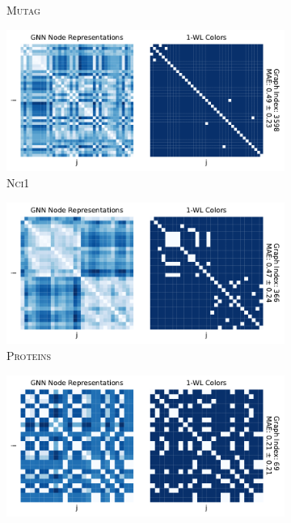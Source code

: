 \begin{figure}
\begin{subfigure}[b]{0.49\textwidth}
		\vspace*{-5ex} 
        \caption{\textsc{Mutag}}
	\end{subfigure}
	\hfill
	\begin{subfigure}[b]{0.49\textwidth}
		\centering
		\includegraphics[width=\textwidth]{Figures/heatmaps_NCI1_single.pdf}
		\vspace*{-5ex} 
        \caption{\textsc{Nci1}}
	\end{subfigure}
	\par\bigskip
	\begin{subfigure}[b]{0.49\textwidth}
		\centering
		\includegraphics[width=\textwidth]{Figures/heatmaps_PROTEINS_single.pdf}
		\vspace*{-5ex} 
        \caption{\textsc{Proteins}}
	\end{subfigure}
	\hfill
	\begin{subfigure}[b]{0.49\textwidth}
		\centering
		\includegraphics[width=\textwidth]{Figures/heatmaps_IMDB-BINARY_single.pdf}

\end{subfigure}
\end{figure}
